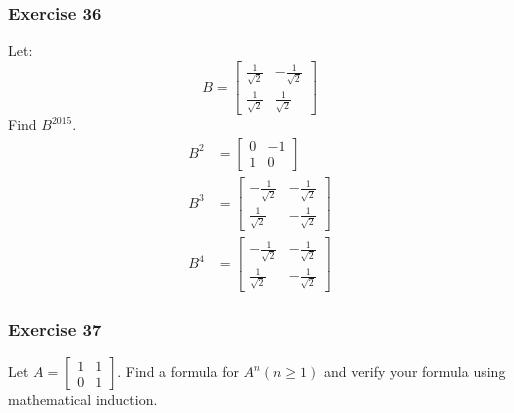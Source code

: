 \documentclass[letterpaper, 12pt]{math}
\begin{document}
\subsubsection*{Exercise 36}
Let:
\[ B = \begin{bmatrix}
  \frac{1}{\sqrt{2}} & -\frac{1}{\sqrt{2}} \\
  \frac{1}{\sqrt{2}} & \frac{1}{\sqrt{2}}
\end{bmatrix} \]
Find \( B^{2015} \).
\begin{align*}
  B^2 &= \begin{bmatrix}0 & -1 \\ 1 & 0\end{bmatrix} \\
  B^3 &= \begin{bmatrix}
    -\frac{1}{\sqrt{2}} & -\frac{1}{\sqrt{2}} \\
    \frac{1}{\sqrt{2}} & -\frac{1}{\sqrt{2}}
  \end{bmatrix} \\
  B^4 &= \begin{bmatrix}
    -\frac{1}{\sqrt{2}} & -\frac{1}{\sqrt{2}} \\
    \frac{1}{\sqrt{2}} & -\frac{1}{\sqrt{2}}
  \end{bmatrix}
\end{align*}

\subsubsection*{Exercise 37}
Let \( A = \begin{bmatrix}1 & 1 \\ 0 & 1\end{bmatrix} \). Find a formula for
\( A^n(n\ge1) \) and verify your formula using mathematical induction.
\end{document}
